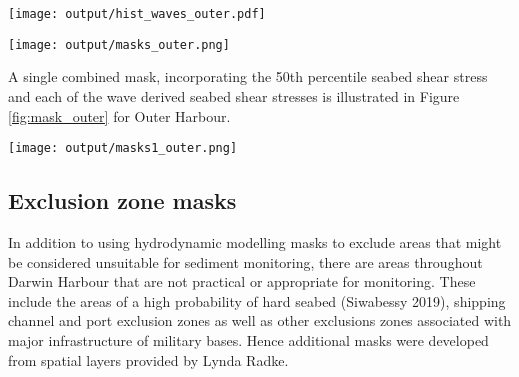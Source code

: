 \documentclass[a4paper]{article}
\let\origfigure=\figure
\let\endorigfigure=\endfigure
\renewenvironment{figure}[1][]{%
   \origfigure[H]
}{%
   \endorigfigure
}
\begin{document}
\begin{figure}
\centering\scriptsize
\texttt{[image: output/hist\_waves\_outer.pdf]}
\caption{Frequency distributions of wave modelling seabed shear stress
products in the Outer Harbour area.\label{fig:hist_waves_outer}}
\end{figure}

\begin{figure}
\centering\scriptsize
\texttt{[image: output/masks\_outer.png]}
\caption{Individual Outer Harbour masks from various hydrodynamic
(bedShear\_\emph{) and wave (beagle\_}) models categorised using a
threshold values of 0.2 for all other than the 75th percentile products
with use a threshold of 0.3 m/s. The blue areas indicate areas of
predicted relatively low erosion and transport potential and thus good
candidate areas for sample site allocation. The black dots illustrate
the position of Munksgaard 2012 sediment sampling
sites.\label{fig:masks_outer}}
\end{figure}

A single combined mask, incorporating the 50th percentile seabed shear
stress and each of the wave derived seabed shear stresses is illustrated
in Figure \ref{fig:mask_outer} for Outer Harbour.

\begin{figure}
\centering\scriptsize
\texttt{[image: output/masks1\_outer.png]}
\caption{Outer Harbour mask derived from the combination of 50th
percentile seabed shear stress and each of the wave derived seabed shear
stresses. The blue areas indicate areas of predicted relatively low
erosion and transport potential and thus good candidate areas for sample
site allocation. The black dots illustrate the position of Munksgaard
2012 sediment sampling sites.\label{fig:mask_outer}}
\end{figure}

\hypertarget{exclusion-zone-masks}{%
\subsection{Exclusion zone masks}\label{exclusion-zone-masks}}

In addition to using hydrodynamic modelling masks to exclude areas that
might be considered unsuitable for sediment monitoring, there are areas
throughout Darwin Harbour that are not practical or appropriate for
monitoring. These include the areas of a high probability of hard seabed
(Siwabessy 2019), shipping channel and port exclusion zones as well as
other exclusions zones associated with major infrastructure of military
bases. Hence additional masks were developed from spatial layers
provided by Lynda Radke.
\end{document}
